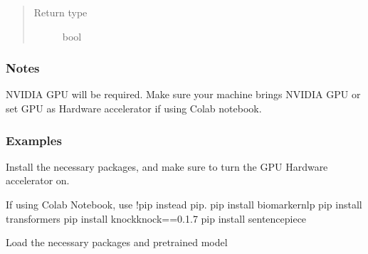 \documentclass[letterpaper,10pt,english]{sphinxmanual}
\begin{document}
\begin{fulllineitems}
\begin{quote}
\begin{description}
\item[{Return type}] \leavevmode
\sphinxAtStartPar
bool

\end{description}\end{quote}


\nopagebreak


\sphinxAtStartPar
{\hyperref[\detokenize{negation_cue_scope:negation_cue_scope.negation_scope}]{}}


\subsubsection*{Notes}

\sphinxAtStartPar
NVIDIA GPU will be required. Make sure your machine brings NVIDIA GPU or set GPU as Hardware accelerator if using Colab notebook.
\subsubsection*{Examples}

\sphinxAtStartPar
Install the necessary packages, and make sure to turn the GPU Hardware accelerator on.

\begin{sphinxVerbatim}[commandchars=\\\{\}]
\PYGZgt{}\PYGZgt{}\PYGZgt{} If using Colab Notebook, use !pip instead pip.
\PYGZdl{} pip install biomarker\PYGZus{}nlp
\PYGZdl{} pip install transformers
\PYGZdl{} pip install knockknock==0.1.7
\PYGZdl{} pip install sentencepiece
\end{sphinxVerbatim}

\sphinxAtStartPar
Load the necessary packages and pre\sphinxhyphen{}trained model

\begin{sphinxVerbatim}[commandchars=\\\{\}]
   
    
   
\end{sphinxVerbatim}


\end{fulllineitems}
\end{document}
